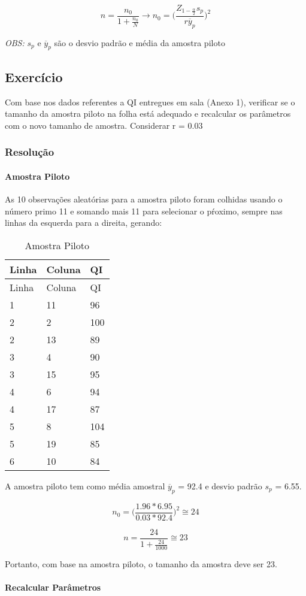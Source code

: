 \documentclass[]{article}
\let\oldparagraph\paragraph
\renewcommand{\paragraph}[1]{\oldparagraph{#1}\mbox{}}
\begin{document}
\[
n=\dfrac{n_0}{1+\frac{n_0}{N}} \rightarrow n_0=\bigg(\dfrac{Z_{1-\frac{\alpha}{2}}s_p}{r\overline{y}_p}\bigg)^2
\]

\emph{OBS:} \(s_p\) e \(\overline{y}_p\) são o desvio padrão e média da
amostra piloto

\subsection{Exercício}\label{exercicio}

Com base nos dados referentes a QI entregues em sala (Anexo 1),
verificar se o tamanho da amostra piloto na folha está adequado e
recalcular os parâmetros com o novo tamanho de amostra. Considerar r =
0.03

\subsubsection{Resolução}\label{resolucao-4}

\paragraph{Amostra Piloto}\label{amostra-piloto}

As 10 observações aleatórias para a amostra piloto foram colhidas usando
o número primo 11 e somando mais 11 para selecionar o pŕoximo, sempre
nas linhas da esquerda para a direita, gerando:

\begin{longtable}[]{@{}lll@{}}
\caption{Amostra Piloto}\tabularnewline
\toprule
Linha & Coluna & QI\tabularnewline
\midrule
\endfirsthead
\toprule
Linha & Coluna & QI\tabularnewline
\midrule
\endhead
1 & 11 & 96\tabularnewline
2 & 2 & 100\tabularnewline
2 & 13 & 89\tabularnewline
3 & 4 & 90\tabularnewline
3 & 15 & 95\tabularnewline
4 & 6 & 94\tabularnewline
4 & 17 & 87\tabularnewline
5 & 8 & 104\tabularnewline
5 & 19 & 85\tabularnewline
6 & 10 & 84\tabularnewline
\bottomrule
\end{longtable}

A amostra piloto tem como média amostral \(\overline{y}_p\) = 92.4 e
desvio padrão \(s_p\) = 6.55.

\[
n_0=\bigg(\dfrac{1.96*6.95}{0.03*92.4}\bigg)^2\cong 24
\]

\[
n = \dfrac{24}{1+\frac{24}{1000}}\cong 23
\]

Portanto, com base na amostra piloto, o tamanho da amostra deve ser 23.

\paragraph{Recalcular Parâmetros}\label{recalcular-parametros}
\end{document}

